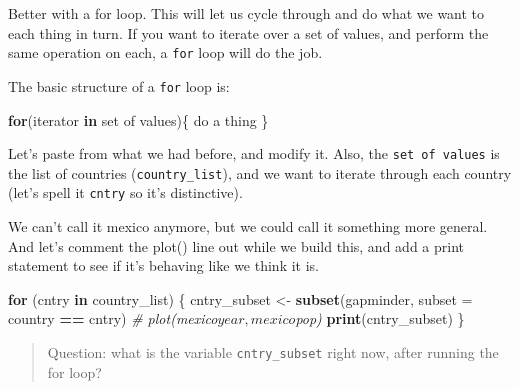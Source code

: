 \documentclass[]{book}
\newenvironment{Shaded}{\begin{snugshade}}{\end{snugshade}}
\newcommand{\KeywordTok}[1]{\textcolor[rgb]{0.13,0.29,0.53}{\textbf{#1}}}
\newcommand{\DataTypeTok}[1]{\textcolor[rgb]{0.13,0.29,0.53}{#1}}
\newcommand{\StringTok}[1]{\textcolor[rgb]{0.31,0.60,0.02}{#1}}
\newcommand{\CommentTok}[1]{\textcolor[rgb]{0.56,0.35,0.01}{\textit{#1}}}
\newcommand{\ControlFlowTok}[1]{\textcolor[rgb]{0.13,0.29,0.53}{\textbf{#1}}}
\newcommand{\OperatorTok}[1]{\textcolor[rgb]{0.81,0.36,0.00}{\textbf{#1}}}
\newcommand{\NormalTok}[1]{#1}
\theoremstyle{definition}
\theoremstyle{definition}
\theoremstyle{definition}
\theoremstyle{remark}
\begin{document}
Better with a for loop. This will let us cycle through and do what we
want to each thing in turn. If you want to iterate over a set of values,
and perform the same operation on each, a \texttt{for} loop will do the
job.

The basic structure of a \texttt{for} loop is:

\begin{Shaded}
\begin{Highlighting}[]
\ControlFlowTok{for}\NormalTok{(iterator }\ControlFlowTok{in}\NormalTok{ set of values)\{}
\NormalTok{  do a thing}
\NormalTok{\}}
\end{Highlighting}
\end{Shaded}

Let's paste from what we had before, and modify it. Also, the
\texttt{set\ of\ values} is the list of countries
(\texttt{country\_list}), and we want to iterate through each country
(let's spell it \texttt{cntry} so it's distinctive).

\begin{Shaded}
\end{Shaded}

We can't call it mexico anymore, but we could call it something more
general. And let's comment the plot() line out while we build this, and
add a print statement to see if it's behaving like we think it is.

\begin{Shaded}
\begin{Highlighting}[]
\ControlFlowTok{for}\NormalTok{ (cntry }\ControlFlowTok{in}\NormalTok{ country_list) \{}
\NormalTok{  cntry_subset <-}\StringTok{ }\KeywordTok{subset}\NormalTok{(gapminder, }\DataTypeTok{subset =}\NormalTok{ country }\OperatorTok{==}\StringTok{ }\NormalTok{cntry)  }
  \CommentTok{# plot(mexico$year, mexico$pop)}
  \KeywordTok{print}\NormalTok{(cntry_subset)}
\NormalTok{\} }
\end{Highlighting}
\end{Shaded}

\begin{quote}
Question: what is the variable \texttt{cntry\_subset} right now, after
running the for loop?
\end{quote}
\end{document}
